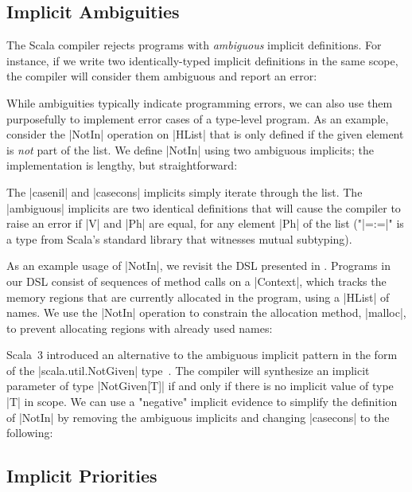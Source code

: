 \subsection{Implicit Ambiguities}

The Scala compiler rejects programs with \emph{ambiguous} implicit definitions.
For instance, if we write two identically-typed implicit definitions in the same scope, the compiler will consider them ambiguous and report an error:

\implicitAmbiguity

While ambiguities typically indicate programming errors, we can also use them purposefully to implement error cases of a type-level program.
As an example, consider the |NotIn| operation on |HList| that is only defined if the given element is \emph{not} part of the list.
We define |NotIn| using two ambiguous implicits; the implementation is lengthy, but straightforward:

\memImplicitNotIn

\noindent
The |casenil| and |casecons| implicits simply iterate through the list.
The |ambiguous| implicits are two identical definitions that will cause the compiler to raise an error if |V| and |Ph| are equal, for any element |Ph| of the list ("|=:=|" is a type from Scala's standard library that witnesses mutual subtyping).

As an example usage of |NotIn|, we revisit the DSL presented in .
Programs in our DSL consist of sequences of method calls on a |Context|, which tracks the memory regions that are currently allocated in the program, using a |HList| of names.
We use the |NotIn| operation to constrain the allocation method, |malloc|, to prevent allocating regions with already used names:

\memImplicitContextMalloc

Scala~3 introduced an alternative to the ambiguous implicit pattern in the form of the |scala.util.NotGiven| type~\citep[Given Instances]{odersky2013scala}.
The compiler will synthesize an implicit parameter of type |NotGiven[T]| if and only if there is no implicit value of type |T| in scope.
We can use a "negative" implicit evidence to simplify the definition of |NotIn| by removing the ambiguous implicits and changing |casecons| to the following:

\memImplicitNotGiven

\subsection{Implicit Priorities}

